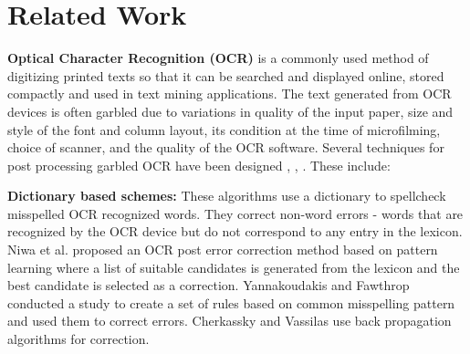 \documentclass[letterpaper]{article}
\begin{document}
\section{Related Work}
\label{sec:related}
\noindent \textbf{Optical Character Recognition (OCR)} is a commonly used method of digitizing printed texts so that it can be searched and displayed online, stored compactly and used in text mining applications. The text generated from OCR devices is often garbled due to variations in quality of the input paper, size and style of the font and column layout, its condition at the time of microfilming, choice of scanner, and the quality of the OCR software. Several techniques for post processing garbled OCR have been designed \cite{Fujisawa_08}, \cite{Esakov_94}, \cite{Lecun_90}. These include:

\noindent \textbf{Dictionary based schemes: }These algorithms use a dictionary to spellcheck misspelled OCR recognized words. They correct non-word errors - words that are recognized by the OCR device but do not correspond to any entry in the lexicon. Niwa et al. \cite{postprocessing} proposed an OCR post error correction method based on pattern learning where a list of suitable candidates is generated from the lexicon and the best candidate is selected as a correction. Yannakoudakis and Fawthrop \cite{Yannakoudakis_83} conducted a study to create a set of rules based on common misspelling pattern and used them to correct errors. Cherkassky and Vassilas \cite{Cherkassky_89} use back propagation algorithms for correction. 
\end{document}
